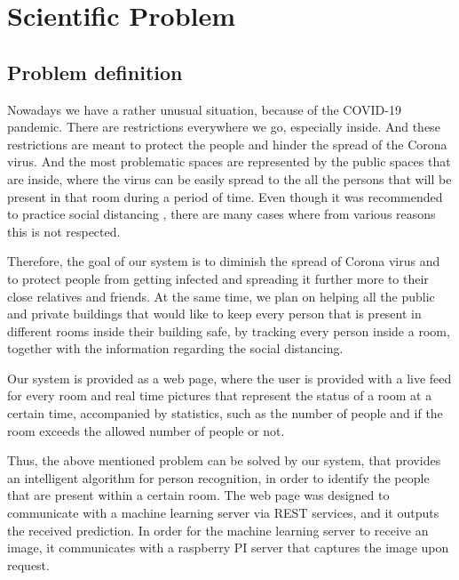 \documentclass[runningheads,a4paper,11pt]{report}
\begin{document}
\chapter{Scientific Problem}
\label{section:scientificProblem}


\section{Problem definition}
\label{section:problemDefinition}


Nowadays we have a rather unusual situation, because of the COVID-19 pandemic. There are restrictions everywhere we go, especially inside. And these restrictions are meant to protect the people and hinder the spread of the Corona virus. And the most problematic spaces are represented by the public spaces that are inside, where the virus can be easily spread to the all the persons that will be present in that room during a period of time. Even though it was recommended to practice social distancing , there are many cases where from various reasons this is not respected.

Therefore, the goal of our system is to diminish the spread of Corona virus and to protect people from getting infected and spreading it further more to their close relatives and friends. At the same time, we plan on helping all the public and private buildings that would like to keep every person that is present in different rooms inside their building safe, by tracking every person inside a room, together with the information regarding the social distancing.

Our system is provided as a web page, where the user is provided with a live feed for every room and real time pictures that represent the status of a room at a certain time,  accompanied by statistics, such as the number of people and if the room exceeds the allowed number of people or not.

Thus, the above mentioned problem can be solved by our system, that provides an intelligent algorithm for person recognition, in order to identify the people that are present within a certain room.
The web page was designed to communicate with a machine learning server via REST services, and it outputs the received prediction. In order for the machine learning server to receive an image, it communicates with a raspberry PI server that captures the image upon request.
\end{document}
